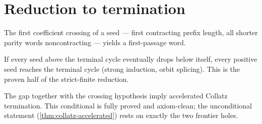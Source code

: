 \section{Reduction to termination}

\begin{theorem}
  \label{thm:collatz-crossing-firstpassage}
  \leanok
  The first coefficient crossing of a seed --- first contracting prefix length, all shorter
  parity words noncontracting --- yields a first-passage word.
\end{theorem}
\begin{theorem}
  \label{thm:collatz-reduction}
  \leanok
  If every seed above the terminal cycle eventually drops below itself, every positive seed
  reaches the terminal cycle (strong induction, orbit splicing). This is the proven half of the
  strict-finite reduction.
\end{theorem}
\begin{theorem}
  \label{thm:collatz-conditional}
  \leanok
  The gap together with the crossing hypothesis imply accelerated Collatz termination. This
  conditional is fully proved and axiom-clean; the unconditional statement
  (\cref{thm:collatz-accelerated}) rests on exactly the two frontier holes.
\end{theorem}
